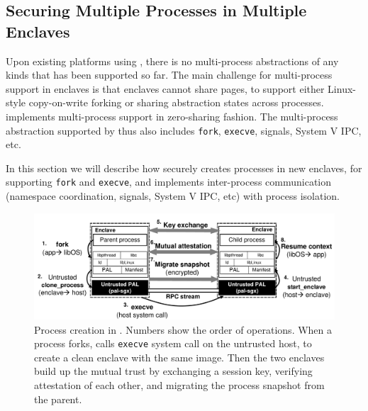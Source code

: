 \subsection{Securing Multiple Processes in Multiple Enclaves}
\label{sec:gsgx:multiproc}

Upon existing platforms using \sgx{}, there is no
multi-process abstractions of any kinds that has been supported so far.
The main challenge for multi-process support in enclaves
is that enclaves cannot share pages,
to support either Linux-style copy-on-write forking or
sharing abstraction states across processes.
\graphene{} implements multi-process support
in zero-sharing fashion.
The multi-process abstraction supported by \graphene{} thus also \graphenesgx{}
includes {\tt fork}, {\tt execve}, signals, System V IPC, etc.

In this section we will describe how \graphenesgx{} securely creates
processes in new enclaves,
for supporting {\tt fork} and {\tt execve},
and implements inter-process communication
(namespace coordination, signals, System V IPC, etc)
with process isolation.


\begin{figure}[t!]
\centering
\includegraphics[width=6.5in]{graphene-sgx/figures/fork.pdf}
\footnotesize
\caption[Process creation in \graphenesgx{}]
{Process creation in \graphenesgx{}.
Numbers show the order of operations.
When a process forks, \graphenesgx{} calls {\tt execve} system call
on the untrusted host,
to create a clean enclave with the same \libos{} image.
Then the two enclaves build up the mutual trust by
exchanging a session key, verifying attestation of each other,
and migrating the process snapshot from the parent.}
\label{fig:graphene:sgx-fork}
\end{figure}

